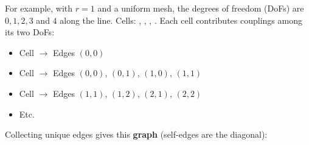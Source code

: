 \begin{enumerate}
\begin{itemize}
        \begin{examplebox}[: Graph 1D]
            For example, with $r = 1$ and a uniform mesh, the degrees of freedom (DoFs) are $0, 1, 2, 3$ and $4$ along the line. Cells: \code{[0, 1]}, \code{[1, 2]}, \code{[2, 3]}, \code{[3, 4]}. Each cell contributes couplings among its two DoFs:
            \begin{itemize}
                \item Cell \code{[0, 1]} $\rightarrow$ Edges $(0,0)$
            \end{itemize}
            \begin{itemize}
                \item Cell \code{[0, 1]} $\rightarrow$ Edges $(0,0)$, $(0,1)$, $(1,0)$, $(1,1)$
                \item Cell \code{[1, 2]} $\rightarrow$ Edges $(1,1)$, $(1,2)$, $(2,1)$, $(2,2)$
                \item Etc.
            \end{itemize}
            Collecting unique edges gives this \textbf{graph} (self-edges are the diagonal):
            \begin{center}
\end{center}
\end{examplebox}
\end{itemize}
\end{enumerate}
